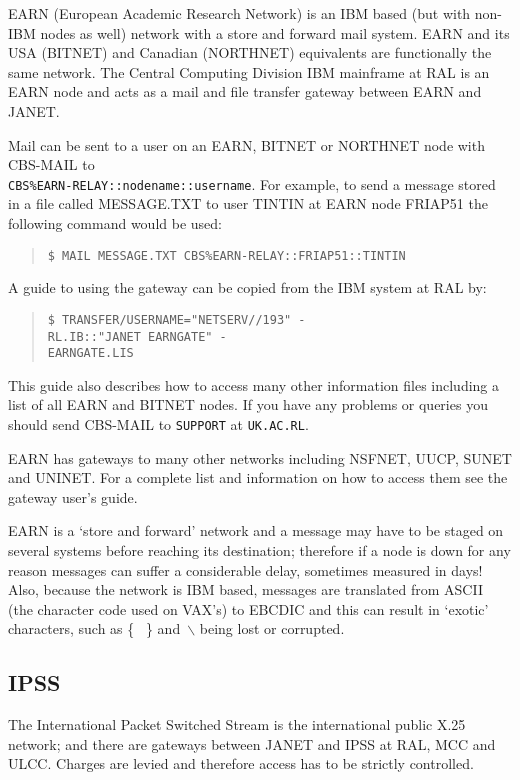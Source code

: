 EARN (European Academic Research Network) is an IBM based (but with non-IBM
nodes as well) network with a store and forward mail system.
EARN and its USA (BITNET) and Canadian (NORTHNET) equivalents are functionally
the same network.
The Central Computing Division IBM mainframe at RAL is an EARN node and acts as
a mail and file transfer gateway between EARN and JANET.

Mail can be sent to a user on an EARN, BITNET or NORTHNET node with CBS-MAIL
to \\ {\tt CBS\%EARN-RELAY::nodename::username}.
For example, to send a message stored in a file called MESSAGE.TXT to user
TINTIN at EARN node FRIAP51 the following command would be used:
\begin{quote}
{\tt \$ MAIL MESSAGE.TXT CBS\%EARN-RELAY::FRIAP51::TINTIN}
\end{quote}
A guide to using the gateway can be copied from the IBM system at RAL by:
\begin{quote}
{\tt \$ TRANSFER/USERNAME="NETSERV//193" -\\
\hspace*{30mm}RL.IB::"JANET EARNGATE" -\\
\hspace*{30mm}EARNGATE.LIS}
\end{quote}
This guide also describes how to access many other information files including
a list of all EARN and BITNET nodes.
If you have any problems or queries you should send CBS-MAIL to {\tt SUPPORT}
at {\tt UK.AC.RL}.

EARN has gateways to many other networks including NSFNET, UUCP, SUNET and
UNINET. For a complete list and information on how to access them see the
gateway user's guide.

EARN is a `store and forward' network and a message may have to be staged on
several systems before reaching its destination; therefore if a node is down for
any reason messages can suffer a considerable delay, sometimes measured in days!
Also, because the network is IBM based, messages are translated from
ASCII (the character code used on VAX's) to EBCDIC and this can result in
`exotic' characters, such as \{ ~\} and~$\backslash$ being lost or corrupted.

\subsection{IPSS}

The International Packet Switched Stream is the international public X.25
network; and there are gateways between JANET and IPSS at RAL, MCC and ULCC.
Charges are levied and therefore access has to be strictly controlled.

